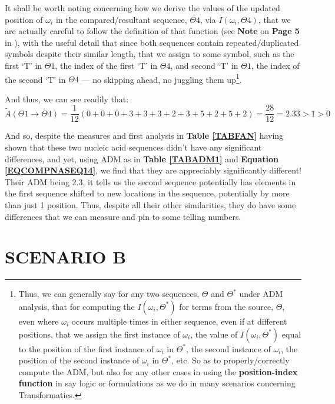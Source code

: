 \documentclass[a4paper, 18pt]{book} %
\begin{document}
It shall be worth noting concerning how we derive the values of the updated position of $\omega_i$ in the compared/resultant sequence, $\Theta4$, via $I(\omega_i,\Theta4)$, that we are actually careful to follow the definition of that function (see \textbf{Note} on \textbf{Page 5} in \cite{transformatics}), with the useful detail that since both sequences contain repeated/duplicated symbols despite their similar length, that we assign to some symbol, such as the first `T' in $\Theta1$, the index of the first `T' in $\Theta4$, and second `T' in $\Theta1$, the index of the second `T' in $\Theta4$ --- no skipping ahead, no juggling them up\footnote{Thus, we can generally say for any two sequences, $\Theta$ and $\Theta^*$ under ADM analysis, that for computing the $I(\omega_i,\Theta^*)$ for terms from the source, $\Theta$, even where $\omega_i$ occurs multiple times in either sequence, even if at different positions, that we assign the first instance of $\omega_i$, the value of $I(\omega_i,\Theta^*)$ equal to the position of the first instance of $\omega_i$ in $\Theta^*$, the second instance of $\omega_i$, the position of the second instance of $\omega_i$ in $\Theta^*$, etc. So as to properly/correctly compute the ADM, but also for any other cases in using the \textbf{position-index function} in say logic or formulations as we do in many scenarios concerning Transformatics.}.

And thus, we can see readily that:\\

\begin{equation}
\label{EQCOMPNASEQ14}
\tilde{A}(\Theta1 \rightarrow \Theta4) = \frac{1}{12}(0 + 0 + 0 + 3 + 3 + 3 + 2 + 3 + 5 + 2 + 5 + 2) = \frac{28}{12} = 2.3\bar{3} > 1 > 0
\end{equation}

And so, despite the measures and first analysis in \textbf{Table \ref{TABFAN}} having shown that these two nucleic acid sequences didn't have any significant differences, and yet, using ADM as in \textbf{Table \ref{TABADM1}} and \textbf{Equation \ref{EQCOMPNASEQ14}}, we find that they are appreciably significantly different! Their ADM being $2.3$, it tells us the second sequence potentially has elements in the first sequence shifted to new locations in the sequence, potentially by more than just 1 position. Thus, despite all their other similarities, they do have some differences that we can measure and pin to some telling numbers.

\section{SCENARIO B}
\label{SECSCENB}
\end{document}

